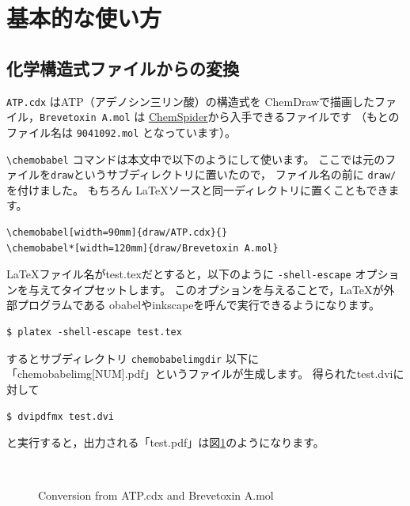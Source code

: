 \documentclass[12pt]{ltjsarticle}
\def\Lcode#1{\texttt{#1}}
\begin{document}
\clearpage

\section{基本的な使い方}
\label{basic}

\subsection{化学構造式ファイルからの変換}

\verb|ATP.cdx| はATP（アデノシン三リン酸）の構造式を
ChemDrawで描画したファイル，\verb|Brevetoxin A.mol| は
\href{http://www.chemspider.com/}{ChemSpider}から入手できるファイルです
（もとのファイル名は \verb|9041092.mol| となっています）。

\verb|\chemobabel| コマンドは本文中で以下のようにして使います。
ここでは元のファイルを\Lcode{draw}というサブディレクトリに置いたので，
ファイル名の前に \Lcode{draw/} を付けました。
もちろん \LaTeX ソースと同一ディレクトリに置くこともできます。

\begin{verbatim}
\chemobabel[width=90mm]{draw/ATP.cdx}{}
\chemobabel*[width=120mm]{draw/Brevetoxin A.mol}
\end{verbatim}

\LaTeX ファイル名がtest.texだとすると，以下のように
\verb|-shell-escape| オプションを与えてタイプセットします。
このオプションを与えることで，\LaTeX が外部プログラムである
obabelやinkscapeを呼んで実行できるようになります。
\begin{verbatim}
$ platex -shell-escape test.tex
\end{verbatim}
するとサブディレクトリ \verb|chemobabelimgdir| 以下に
「chemobabelimg[NUM].pdf」というファイルが生成します。
得られたtest.dviに対して
\begin{verbatim}
$ dvipdfmx test.dvi
\end{verbatim}
と実行すると，出力される「test.pdf」は図\ref{fig:chem1}のようになります。

\begin{figure}[h]
  \centering
   \\ \vspace{1cm}
  \caption{Conversion from ATP.cdx and Brevetoxin A.mol}\label{fig:chem1}
\end{figure}
\end{document}

